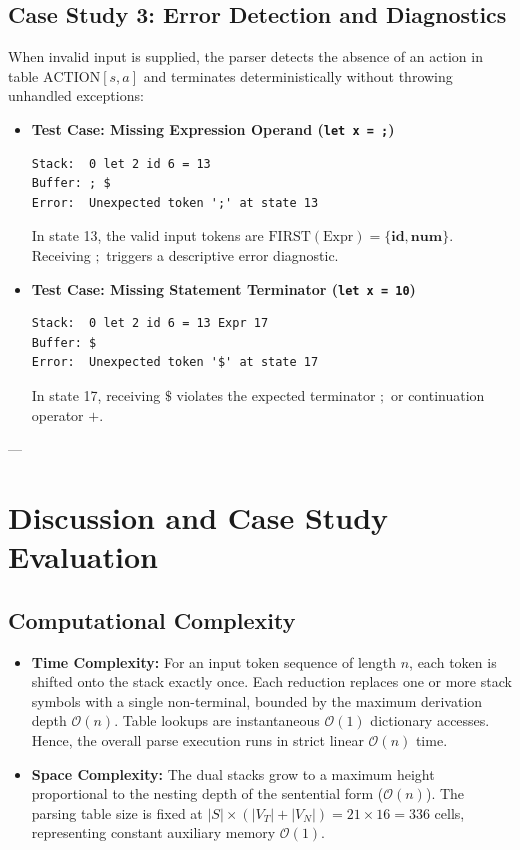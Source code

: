 \documentclass[11pt,a4paper]{article}
\begin{document}
\subsection{Case Study 3: Error Detection and Diagnostics}
When invalid input is supplied, the parser detects the absence of an action in table $\text{ACTION}[s, a]$ and terminates deterministically without throwing unhandled exceptions:
\begin{itemize}
    \item \textbf{Test Case: Missing Expression Operand (\texttt{let x = ;})}
\begin{lstlisting}
Stack:  0 let 2 id 6 = 13
Buffer: ; $
Error:  Unexpected token ';' at state 13
\end{lstlisting}
    In state 13, the valid input tokens are $\text{FIRST}(\text{Expr}) = \{ \mathbf{id}, \mathbf{num} \}$. Receiving $;$ triggers a descriptive error diagnostic.
    
    \item \textbf{Test Case: Missing Statement Terminator (\texttt{let x = 10})}
\begin{lstlisting}
Stack:  0 let 2 id 6 = 13 Expr 17
Buffer: $
Error:  Unexpected token '$' at state 17
\end{lstlisting}
    In state 17, receiving $\$$ violates the expected terminator $;$ or continuation operator $+$.
\end{itemize}

---

\section{Discussion and Case Study Evaluation}

\subsection{Computational Complexity}
\begin{itemize}
    \item \textbf{Time Complexity:} For an input token sequence of length $n$, each token is shifted onto the stack exactly once. Each reduction replaces one or more stack symbols with a single non-terminal, bounded by the maximum derivation depth $\mathcal{O}(n)$. Table lookups are instantaneous $\mathcal{O}(1)$ dictionary accesses. Hence, the overall parse execution runs in strict linear $\mathcal{O}(n)$ time.
    \item \textbf{Space Complexity:} The dual stacks grow to a maximum height proportional to the nesting depth of the sentential form ($\mathcal{O}(n)$). The parsing table size is fixed at $|S| \times (|V_T| + |V_N|) = 21 \times 16 = 336$ cells, representing constant auxiliary memory $\mathcal{O}(1)$.
\end{itemize}
\end{document}
